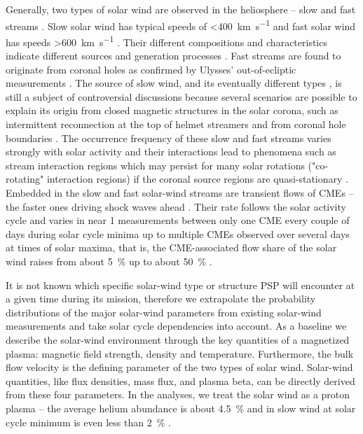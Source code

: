 \documentclass[]{aa}
\begin{document}
        Generally, two types of solar wind are observed in the heliosphere -- slow and fast streams \citep{Neugebauer1966,Schwenn1983}. Slow solar wind has typical speeds of \SI{<400}{\km\per\s} and fast solar wind has speeds \SI{>600}{\km\per\s} \citep[p.~144]{Schwenn1990}. Their different compositions and characteristics indicate different sources and generation processes \citep{McGregor2011a}. Fast streams are found to originate from coronal holes as confirmed by Ulysses' out-of-ecliptic measurements \citep{McComas1998}. The source of slow wind, and its eventually different types \citep{Schwenn1983}, is still a subject of controversial discussions because several scenarios are possible to explain its origin from closed magnetic structures in the solar corona, such as intermittent reconnection at the top of helmet streamers and from coronal hole boundaries \citep{Kilpua2016}. The occurrence frequency of these slow and fast streams varies strongly with solar activity and their interactions lead to phenomena such as stream interaction regions which may persist for many solar rotations ("co-rotating" interaction regions) if the coronal source regions are quasi-stationary \citep{Balogh1999}.
        Embedded in the slow and fast solar-wind streams are transient flows of CMEs -- the faster ones driving shock waves ahead \citep{Gosling1974}. Their rate follows the solar activity cycle and varies in near \SI{1}{\au} measurements between only one CME every couple of days during solar cycle minima up to multiple CMEs observed over several days at times of solar maxima, that is, the CME-associated flow share of the solar wind raises from about \SI{5}{\percent} up to about \SI{50}{\percent} \citep{Richardson2012}.

        It is not known which specific solar-wind type or structure PSP will encounter at a given time during its mission, therefore we extrapolate the probability distributions of the major solar-wind parameters from existing solar-wind measurements and take solar cycle dependencies into account.
        As a baseline we describe the solar-wind environment through the key quantities of a magnetized plasma: magnetic field strength, density and temperature. Furthermore, the bulk flow {velocity} is the defining parameter of the two types of solar wind. Solar-wind quantities, like flux densities, mass flux, and plasma beta, can be directly derived from these four parameters. In the analyses, we treat the solar wind as a proton plasma -- the average helium abundance is about \SI{4.5}{\percent} and in slow wind at solar cycle minimum is even less than \SI{2}{\percent} \citep{Feldman1978,Schwenn1983,Kasper2012}.
\end{document}

